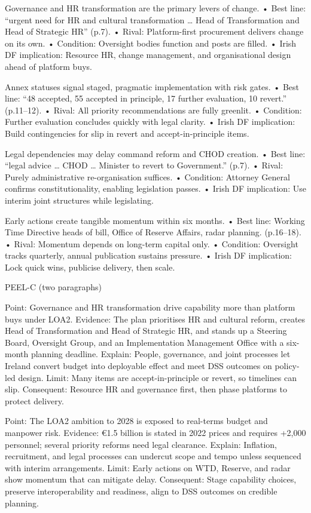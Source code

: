 Governance and HR transformation are the primary levers of change.
• Best line: “urgent need for HR and cultural transformation … Head of Transformation and Head of Strategic HR” (p.7).
• Rival: Platform-first procurement delivers change on its own.
• Condition: Oversight bodies function and posts are filled.
• Irish DF implication: Resource HR, change management, and organisational design ahead of platform buys.

Annex statuses signal staged, pragmatic implementation with risk gates.
• Best line: “48 accepted, 55 accepted in principle, 17 further evaluation, 10 revert.” (p.11–12).
• Rival: All priority recommendations are fully greenlit.
• Condition: Further evaluation concludes quickly with legal clarity.
• Irish DF implication: Build contingencies for slip in revert and accept-in-principle items.

Legal dependencies may delay command reform and CHOD creation.
• Best line: “legal advice … CHOD … Minister to revert to Government.” (p.7).
• Rival: Purely administrative re-organisation suffices.
• Condition: Attorney General confirms constitutionality, enabling legislation passes.
• Irish DF implication: Use interim joint structures while legislating.

Early actions create tangible momentum within six months.
• Best line: Working Time Directive heads of bill, Office of Reserve Affairs, radar planning. (p.16–18).
• Rival: Momentum depends on long-term capital only.
• Condition: Oversight tracks quarterly, annual publication sustains pressure.
• Irish DF implication: Lock quick wins, publicise delivery, then scale.

PEEL-C (two paragraphs)

Point: Governance and HR transformation drive capability more than platform buys under LOA2.
Evidence: The plan prioritises HR and cultural reform, creates Head of Transformation and Head of Strategic HR, and stands up a Steering Board, Oversight Group, and an Implementation Management Office with a six-month planning deadline.
Explain: People, governance, and joint processes let Ireland convert budget into deployable effect and meet DSS outcomes on policy-led design.
Limit: Many items are accept-in-principle or revert, so timelines can slip.
Consequent: Resource HR and governance first, then phase platforms to protect delivery.

Point: The LOA2 ambition to 2028 is exposed to real-terms budget and manpower risk.
Evidence: €1.5 billion is stated in 2022 prices and requires +2,000 personnel; several priority reforms need legal clearance.
Explain: Inflation, recruitment, and legal processes can undercut scope and tempo unless sequenced with interim arrangements.
Limit: Early actions on WTD, Reserve, and radar show momentum that can mitigate delay.
Consequent: Stage capability choices, preserve interoperability and readiness, align to DSS outcomes on credible planning.

